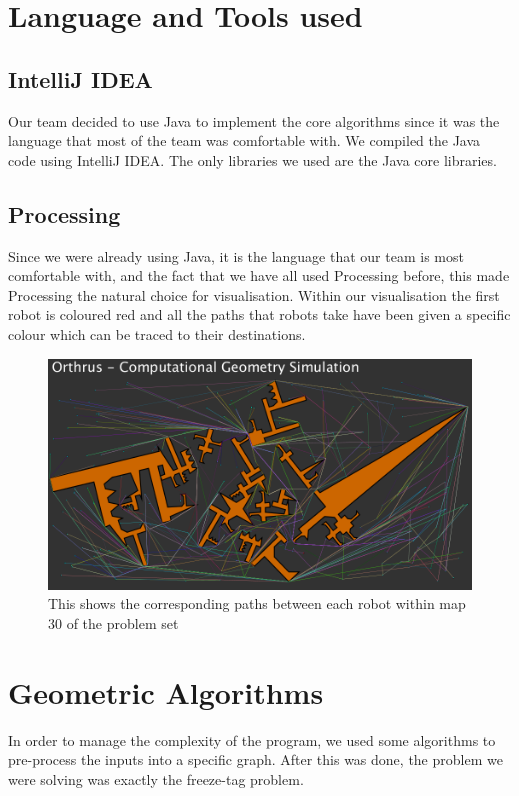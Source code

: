 \documentclass[12pt]{article}
\begin{document}
\section{Language and Tools used}
\subsection{IntelliJ IDEA}
Our team decided to use Java to implement the core algorithms since it was the language that most of the team was comfortable with. We compiled the Java code using IntelliJ IDEA. The only libraries we used are the Java core libraries. 

\par
\subsection{Processing}
Since we were already using Java, it is the language that our team is most comfortable with, and the fact that we have all used Processing before, this made Processing the natural choice for visualisation. Within our visualisation the first robot is coloured red and  all the paths that robots take have been given a specific colour which can be traced to their destinations. 
\begin{figure}
	\includegraphics[width=\textwidth]{CS}
	\caption{This shows the corresponding paths between each robot within map 30 of the problem set}
	\centering
\end{figure}

\section{Geometric Algorithms}
In order to manage the complexity of the program, we used some algorithms to pre-process the inputs into a specific graph. After this was done, the problem we were solving was exactly the freeze-tag problem. 
\end{document}
